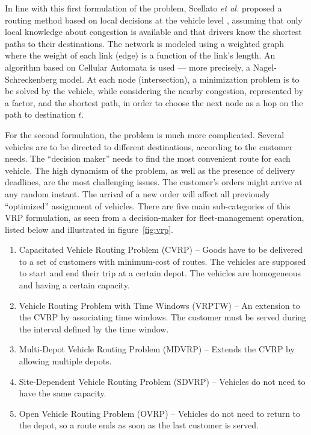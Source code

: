 \documentclass[10pt,onecolumn]{article}
\begin{document}
In line with this first formulation of the problem, Scellato \textit{et al.} proposed a routing method based on local decisions at the vehicle level \cite{Scellato2010}, assuming that only local knowledge about congestion is available and that drivers know the shortest paths to their destinations. The network is modeled using a weighted graph where the weight of each link (edge) is a function of the link's length.
An algorithm based on Cellular Automata is used --- more precisely, a Nagel-Schreckenberg model. 
At each node (intersection), a minimization problem is to be solved by the vehicle, while considering the nearby congestion, represented by a factor, and the shortest path, in order to choose the next node as a hop on the path to destination $t$. 

For the second formulation, the problem is much more complicated. Several vehicles are to be directed to different destinations, according to the customer needs. 
The ``decision maker'' needs to find the most convenient route for each vehicle. 
The high dynamism of the problem, as well as the presence of delivery deadlines, are the most challenging issues.  
The customer's orders might arrive at any random instant. The arrival of a new order will affect all previously ``optimized'' assignment of vehicles. 
There are five main sub-categories of this VRP formulation, as seen from a decision-maker for fleet-management operation, listed below and illustrated in figure~\ref{fig:vrp}.
\begin{enumerate}
 \item Capacitated Vehicle Routing Problem (CVRP) -- Goods have to be delivered to a set of customers with minimum-cost of routes. The vehicles are supposed to start and end their trip at a certain depot. 
	The vehicles are homogeneous and having a certain capacity. 
 \item Vehicle Routing Problem with Time Windows (VRPTW) -- An extension to the CVRP by associating time windows. The customer must be served during the interval defined by the time window.
 \item Multi-Depot Vehicle Routing Problem (MDVRP) -- Extends the CVRP by allowing multiple depots.
 \item Site-Dependent Vehicle Routing Problem (SDVRP) -- Vehicles do not need to have the same capacity.
 \item Open Vehicle Routing Problem (OVRP) -- Vehicles do not need to return to the depot, so a route ends as soon as the last customer is served. 
\end{enumerate}
\end{document}
